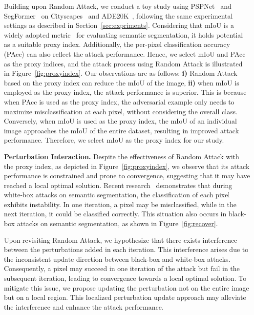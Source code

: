 \documentclass[10pt,twocolumn,letterpaper]{article}
\begin{document}
Building upon Random Attack, we conduct a toy study using PSPNet~\cite{pspnet} and SegFormer~\cite{segformer} on Cityscapes~\cite{cityscapes} and ADE20K~\cite{ade20k}, following the same experimental settings as described in Section~\ref{sec:expriments}. Considering that mIoU is a widely adopted metric~\cite{pascal} for evaluating semantic segmentation,  it holds potential as a suitable proxy index. Additionally, the per-pixel classification accuracy (PAcc) can also reflect the attack performance. Hence, we select mIoU and PAcc as the proxy indices, and the attack process using Random Attack is illustrated in Figure~\ref{fig:proxyindex}. Our observations are as follows: \textbf{i)} Random Attack based on the proxy index can reduce the mIoU of the image, \textbf{ii)} when mIoU is employed as the proxy index, the attack performance is superior. This is because when PAcc is used as the proxy index, the adversarial example only needs to maximize misclassification at each pixel, without considering the overall class. Conversely, when mIoU is used as the proxy index, the mIoU of an individual image approaches the mIoU of the entire dataset, resulting in improved attack performance. Therefore, we select mIoU as the proxy index for our study.


\textbf{Perturbation Interaction.}
Despite the effectiveness of Random Attack with the proxy index, as depicted in Figure~\ref{fig:proxyindex}, we observe that its attack performance is constrained and prone to convergence, suggesting that it may have reached a local optimal solution. Recent research~\cite{segpgd} demonstrates that during white-box attacks on semantic segmentation, the classification of each pixel exhibits instability. In one iteration, a pixel may be misclassified, while in the next iteration, it could be classified correctly. This situation also occurs in black-box attacks on semantic segmentation, as shown in Figure~\ref{fig:recover}.

Upon revisiting Random Attack, we hypothesize that there exists interference between the perturbations added in each iteration. This interference arises due to the inconsistent update direction between black-box and white-box attacks. Consequently, a pixel may succeed in one iteration of the attack but fail in the subsequent iteration, leading to convergence towards a local optimal solution. To mitigate this issue, we propose updating the perturbation not on the entire image but on a local region. This localized perturbation update approach may alleviate the interference and enhance the attack performance.
\end{document}

